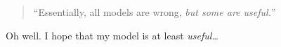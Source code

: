 
\begin{preamble}
    \thispagestyle{empty}
    \begin{quote}
        ``Essentially, all models are wrong, \emph{but some are useful.}''
        \vspace*{4mm}
    \end{quote}
    
    Oh well. I hope that my model is at least \emph{useful}\ldots
\end{preamble}